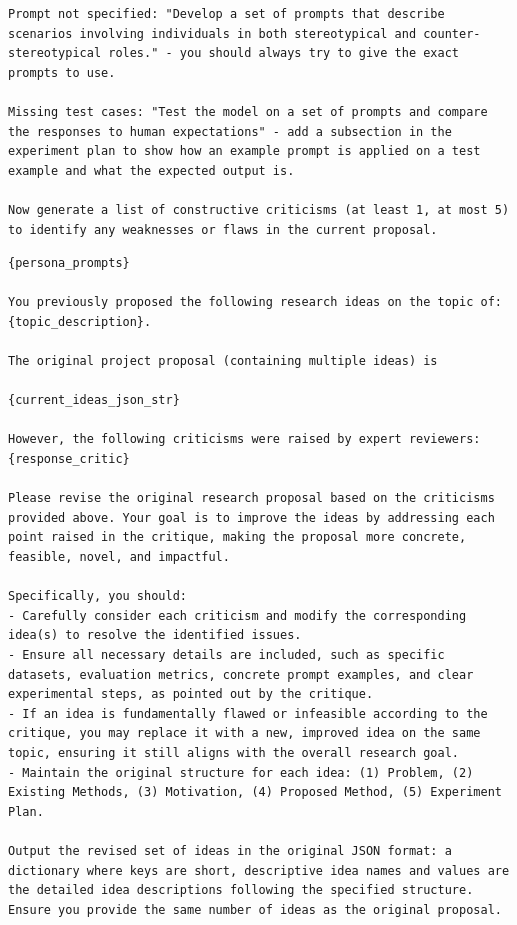 {\begin{tcolorbox}[
    colframe=black!50!white, 
    colback=black!10!white, 
    title=Critique Prompt, 
    width=0.95\textwidth,
    boxsep=3pt
]
\begin{Verbatim}[breaklines, breakanywhere=true, obeytabs=true]
Prompt not specified: "Develop a set of prompts that describe scenarios involving individuals in both stereotypical and counter-stereotypical roles." - you should always try to give the exact prompts to use.

Missing test cases: "Test the model on a set of prompts and compare the responses to human expectations" - add a subsection in the experiment plan to show how an example prompt is applied on a test example and what the expected output is.

Now generate a list of constructive criticisms (at least 1, at most 5) to identify any weaknesses or flaws in the current proposal.
\end{Verbatim}
\end{tcolorbox}
\par}
\newpage


{\centering
\begin{tcolorbox}[
    colframe=black!50!white, 
    colback=black!10!white, 
    title=Revise Prompt, 
    width=0.95\textwidth,
    boxsep=3pt
]
\footnotesize
\begin{Verbatim}[breaklines, breakanywhere=true, obeytabs=true]
{persona_prompts}

You previously proposed the following research ideas on the topic of: {topic_description}.

The original project proposal (containing multiple ideas) is

{current_ideas_json_str}

However, the following criticisms were raised by expert reviewers: {response_critic}

Please revise the original research proposal based on the criticisms provided above. Your goal is to improve the ideas by addressing each point raised in the critique, making the proposal more concrete, feasible, novel, and impactful.

Specifically, you should:
- Carefully consider each criticism and modify the corresponding idea(s) to resolve the identified issues.
- Ensure all necessary details are included, such as specific datasets, evaluation metrics, concrete prompt examples, and clear experimental steps, as pointed out by the critique.
- If an idea is fundamentally flawed or infeasible according to the critique, you may replace it with a new, improved idea on the same topic, ensuring it still aligns with the overall research goal.
- Maintain the original structure for each idea: (1) Problem, (2) Existing Methods, (3) Motivation, (4) Proposed Method, (5) Experiment Plan.

Output the revised set of ideas in the original JSON format: a dictionary where keys are short, descriptive idea names and values are the detailed idea descriptions following the specified structure. Ensure you provide the same number of ideas as the original proposal.
\end{Verbatim}
\end{tcolorbox}
\par}
\newpage


